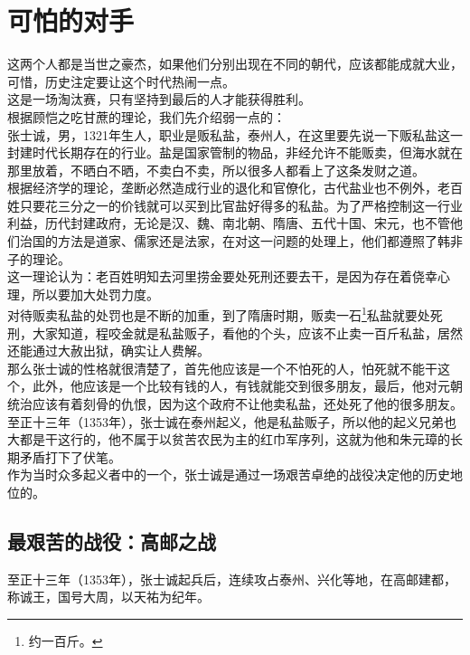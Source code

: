 \section{可怕的对手}
\ifnum{}
	\begin{multicols}{\theparacolNo}
\fi
这两个人都是当世之豪杰，如果他们分别出现在不同的朝代，应该都能成就大业，可惜，历史注定要让这个时代热闹一点。\\

这是一场淘汰赛，只有坚持到最后的人才能获得胜利。\\

根据顾恺之吃甘蔗的理论，我们先介绍弱一点的：\\

张士诚，男，1321年生人，职业是贩私盐，泰州人，在这里要先说一下贩私盐这一封建时代长期存在的行业。盐是国家管制的物品，非经允许不能贩卖，但海水就在那里放着，不晒白不晒，不卖白不卖，所以很多人都看上了这条发财之道。\\

根据经济学的理论，垄断必然造成行业的退化和官僚化，古代盐业也不例外，老百姓只要花三分之一的价钱就可以买到比官盐好得多的私盐。为了严格控制这一行业利益，历代封建政府，无论是汉、魏、南北朝、隋唐、五代十国、宋元，也不管他们治国的方法是道家、儒家还是法家，在对这一问题的处理上，他们都遵照了韩非子的理论。\\

这一理论认为：老百姓明知去河里捞金要处死刑还要去干，是因为存在着侥幸心理，所以要加大处罚力度。\\

对待贩卖私盐的处罚也是不断的加重，到了隋唐时期，贩卖一石\footnote{约一百斤。}私盐就要处死刑，大家知道，程咬金就是私盐贩子，看他的个头，应该不止卖一百斤私盐，居然还能通过大赦出狱，确实让人费解。\\

那么张士诚的性格就很清楚了，首先他应该是一个不怕死的人，怕死就不能干这个，此外，他应该是一个比较有钱的人，有钱就能交到很多朋友，最后，他对元朝统治应该有着刻骨的仇恨，因为这个政府不让他卖私盐，还处死了他的很多朋友。\\

至正十三年（1353年），张士诚在泰州起义，他是私盐贩子，所以他的起义兄弟也大都是干这行的，他不属于以贫苦农民为主的红巾军序列，这就为他和朱元璋的长期矛盾打下了伏笔。\\

作为当时众多起义者中的一个，张士诚是通过一场艰苦卓绝的战役决定他的历史地位的。\\

\subsection{最艰苦的战役：高邮之战}
至正十三年（1353年），张士诚起兵后，连续攻占泰州、兴化等地，在高邮建都，称诚王，国号大周，以天祐为纪年。\\


\end{multicols}

